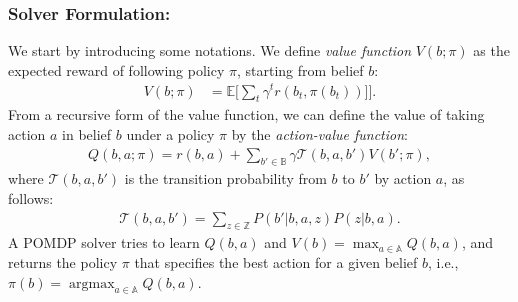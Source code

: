 \documentclass[letterpaper]{article} %
\newcommand{\ph}[1]{{\textbf{#1}:}} %
\newcommand{\argmax}{\mathop{\mathrm{argmax}}}
\begin{document}
\subsubsection{Solver Formulation:} \hfill
\vspace{-0.25pt}

\noindent
We start by introducing some notations.
We define \textit{value function} $V(b; \pi)$ as the expected reward of following policy $\pi$, starting from belief $b$:
\begin{align}
  V(b; \pi) &= \mathbb{E} \Big[ \sum_t \gamma^t r(b_t, \pi(b_t))] \Big].
\end{align}
%
%
From a recursive form of the value function, we can define the value of taking action $a$ in belief $b$ under a policy $\pi$ by the \textit{action-value function}:
\begin{align}
  Q(b, a; \pi) = r(b, a) + \sum_{b' \in \mathbb{B}} \gamma \mathcal{T}(b, a, b') V(b'; \pi),
  \label{eq:q_function}
\end{align}
where $\mathcal{T}(b, a, b')$ is the transition probability from $b$ to $b'$ by action $a$, as follows:
\begin{align}
  \mathcal{T}(b, a, b') = \sum_{z \in \mathbb{Z}} P(b' | b, a, z) P(z | b, a).
\end{align}
A POMDP solver tries to learn $Q(b, a)$ and $V(b) = \max_{a \in \mathbb{A}} Q(b, a)$, and returns the policy $\pi$ that specifies the best action for a given belief $b$, i.e., $\pi(b) = \argmax_{a \in \mathbb{A}} Q(b, a)$.
\end{document}
